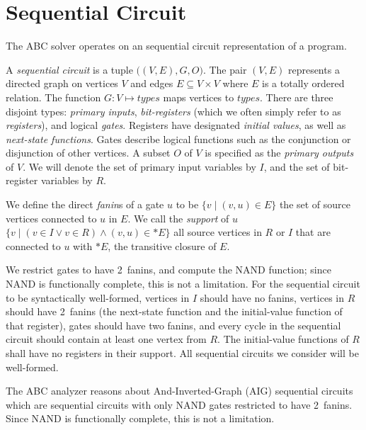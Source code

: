 \section{Sequential Circuit}
\label{sec:preliminaries}

The ABC solver operates on an sequential circuit representation of a program.
\begin{definition}
\rm A {\em sequential circuit} is a tuple $\big( (V, E),G,
O\big)$.  The pair $(V,E)$ represents a directed graph on
vertices $V$ and edges $E \subseteq V\times V$ where $E$
is a totally ordered relation.  The function $G: V \mapsto
{\mathit types}$ maps vertices to ${\mathit types}$.
There are three disjoint types: {\em primary inputs}, {\em
bit-registers} (which we often simply refer to as {\em
registers}), and logical {\em gates}.  Registers have designated
{\em initial values}, as well as {\em next-state
functions}.  Gates describe logical functions such as
the conjunction or disjunction of other vertices. 
A subset $O$ of $V$ is specified as the {\em
primary outputs} of $V$.  
We will denote the set of primary input variables by $I$,
and the set of bit-register variables by $R$.  
\label{def:back:seq_circuit}
\end{definition}

\begin{definition}[Fanins]
\rm We define the direct {\em fanin}s of a gate $u$ to be
$\{v \mid (v,u)\in E\}$ the set of source vertices connected
to $u$ in $E$.  We call the {\em support} of $u$ $\{v \mid
(v\in I \vee v \in R) \wedge (v,u) \in \ast E\}$ all
source vertices in $R$ or $I$ that are connected to $u$
with $\ast E$, the transitive closure of $E$.
\label{def:back:fanins} 
\end{definition}

We restrict gates to have 2~fanins, and
compute the NAND function; since NAND is functionally
complete, this is not a limitation.  For the sequential
circuit to be syntactically well-formed, vertices in $I$
should have no fanins, vertices in $R$ should have
2~fanins (the next-state function and the initial-value
function of that register), gates should have two fanins,
and every cycle in the sequential circuit should contain
at least one vertex from $R$.  The initial-value functions
of $R$ shall have no registers in their support.  All
sequential circuits we consider will be well-formed.  

The ABC analyzer reasons about And-Inverted-Graph (AIG)
sequential circuits which are
sequential circuits with only NAND gates restricted to have 2~fanins.
Since NAND is functionally complete, this is not a limitation.  

